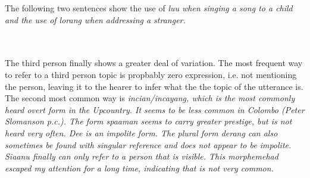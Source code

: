 The following two sentences show the use of \em luu \em when singing a song to a child and the use of \em lorang \em when addressing a stranger.



 \\

 \\

The third person finally shows a greater deal of variation. The most frequent way to refer to a third person topic is propbably zero expression, i.e. not mentioning the person, leaving it to the hearer to infer what the the topic of the utterance is. The second most common way is \em incian/incayang, \em which is the most commonly heard overt form in the Upcountry. It seems to be less common in Colombo (Peter Slomanson p.c.). The form \em spaaman \em seems to carry greater prestige, but is not heard very often. \em Dee \em is an impolite form. The plural form \em derang \em can also sometimes be found with singular reference and does not appear to be impolite. \em Siaanu \em finally can only refer to a person that is visible. This morphemehad escaped my attention for a long time, indicating that is not very common.


